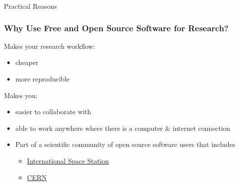 \documentclass[xcolor=dvipsnames]{beamer}
\begin{document}
\begin{frame}

\begin{block}{Practical Reasons}
\frametitle{Why Use Free and Open Source Software for Research?}
Makes your research workflow:
\begin{itemize}
\item cheaper
\item more reproducible 
\newline
\end{itemize}

Makes you:
\begin{itemize}
\item easier to collaborate with 
\item able to work anywhere where there is a computer \& internet connection
\item Part of a scientific community of open source software users that includes \begin{itemize}
      \item \href{https://training.linuxfoundation.org/why-our-linux-training/training-reviews/linux-foundation-training-prepares-the-international-space-station-for-linux-migration}{International Space Station} 
      \item \href{https://linux.web.cern.ch/linux/scientific.shtml}{CERN}
\end{itemize}
\end{itemize}

\end{block}

\end{frame}
\end{document}
